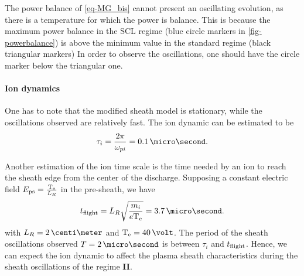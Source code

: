     The power balance of \cref{eq-MG_bis} cannot present an oscillating evolution, as there is a temperature for which the power is balance.
    This is because the maximum power balance in the \ac{SCL} regime (blue circle markers in  \cref{fig-powerbalance}) is above the minimum value in the standard regime (black triangular markers)
    In order to observe the oscillations, one should have the circle marker below the triangular one.
    
    
    \paragraph{ Ion dynamics \\}

    One has to note that the modified sheath model is stationary, while the oscillations observed are relatively fast.
    The ion dynamic can be estimated to be
    \begin{equation} \label{eq-ti}
      \tau_i = \frac{2 \pi}{\opi} = 0.1 \,\micro\second.
    \end{equation}
    
    Another estimation of the ion time scale is the time needed by an ion to reach the sheath edge from the center of the discharge.
    Supposing a constant electric field $E_{\rm ps} = \frac{\mathrm{T_e}}{L_R}$ in the pre-sheath, we have
    \begin{equation} \label{eq-tof}
      t_{\rm flight} = L_R \sqrt{\frac{m_i}{e \Te}} = 3.7 \,\micro\second.
    \end{equation}
    with $L_R=2\,\centi\meter$ and $\Te=40\,\volt$.
    The period of the sheath oscillations observed $T = 2\,\micro\second$ is between $\tau_i$ and $t_{\rm flight}$.
    Hence, we can expect the ion dynamic to affect the plasma sheath characteristics during the sheath oscillations of the regime {\bf II}.
    
